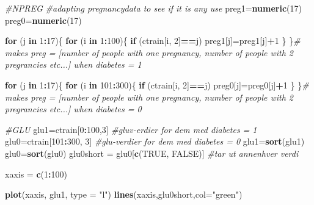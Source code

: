 \documentclass[]{article}
\newenvironment{Shaded}{\begin{snugshade}}{\end{snugshade}}
\newcommand{\KeywordTok}[1]{\textcolor[rgb]{0.13,0.29,0.53}{\textbf{#1}}}
\newcommand{\DataTypeTok}[1]{\textcolor[rgb]{0.13,0.29,0.53}{#1}}
\newcommand{\DecValTok}[1]{\textcolor[rgb]{0.00,0.00,0.81}{#1}}
\newcommand{\StringTok}[1]{\textcolor[rgb]{0.31,0.60,0.02}{#1}}
\newcommand{\CommentTok}[1]{\textcolor[rgb]{0.56,0.35,0.01}{\textit{#1}}}
\newcommand{\OtherTok}[1]{\textcolor[rgb]{0.56,0.35,0.01}{#1}}
\newcommand{\ControlFlowTok}[1]{\textcolor[rgb]{0.13,0.29,0.53}{\textbf{#1}}}
\newcommand{\OperatorTok}[1]{\textcolor[rgb]{0.81,0.36,0.00}{\textbf{#1}}}
\newcommand{\NormalTok}[1]{#1}
\begin{document}
\begin{Shaded}
\begin{Highlighting}[]
\CommentTok{#NPREG}
\CommentTok{#adapting pregnancydata to see if it is any use }
\NormalTok{preg1=}\KeywordTok{numeric}\NormalTok{(}\DecValTok{17}\NormalTok{)}
\NormalTok{preg0=}\KeywordTok{numeric}\NormalTok{(}\DecValTok{17}\NormalTok{)}

\ControlFlowTok{for}\NormalTok{ (j }\ControlFlowTok{in} \DecValTok{1}\OperatorTok{:}\DecValTok{17}\NormalTok{)\{}
  \ControlFlowTok{for}\NormalTok{ (i }\ControlFlowTok{in} \DecValTok{1}\OperatorTok{:}\DecValTok{100}\NormalTok{)\{}
    \ControlFlowTok{if}\NormalTok{ (ctrain[i, }\DecValTok{2}\NormalTok{]}\OperatorTok{==}\NormalTok{j)}
\NormalTok{        preg1[j]=preg1[j]}\OperatorTok{+}\DecValTok{1}
\NormalTok{    \}}
\NormalTok{\}}\CommentTok{# makes preg = [number of people with one pregnancy, number of people with 2 pregrancies etc...] when diabetes = 1}

\ControlFlowTok{for}\NormalTok{ (j }\ControlFlowTok{in} \DecValTok{1}\OperatorTok{:}\DecValTok{17}\NormalTok{)\{}
  \ControlFlowTok{for}\NormalTok{ (i }\ControlFlowTok{in} \DecValTok{101}\OperatorTok{:}\DecValTok{300}\NormalTok{)\{}
    \ControlFlowTok{if}\NormalTok{ (ctrain[i, }\DecValTok{2}\NormalTok{]}\OperatorTok{==}\NormalTok{j)}
\NormalTok{        preg0[j]=preg0[j]}\OperatorTok{+}\DecValTok{1}
\NormalTok{    \}}
\NormalTok{\}}\CommentTok{# makes preg = [number of people with one pregnancy, number of people with 2 pregrancies etc...] when diabetes = 0}


\CommentTok{#GLU}
\NormalTok{glu1=ctrain[}\DecValTok{0}\OperatorTok{:}\DecValTok{100}\NormalTok{,}\DecValTok{3}\NormalTok{] }\CommentTok{#gluv-erdier for dem med diabetes = 1}
\NormalTok{glu0=ctrain[}\DecValTok{101}\OperatorTok{:}\DecValTok{300}\NormalTok{, }\DecValTok{3}\NormalTok{] }\CommentTok{#glu-verdier for dem med diabetes = 0}
\NormalTok{glu1=}\KeywordTok{sort}\NormalTok{(glu1)}
\NormalTok{glu0=}\KeywordTok{sort}\NormalTok{(glu0)}
\NormalTok{glu0short =}\StringTok{ }\NormalTok{glu0[}\KeywordTok{c}\NormalTok{(}\OtherTok{TRUE}\NormalTok{, }\OtherTok{FALSE}\NormalTok{)] }\CommentTok{#tar ut annenhver verdi }

\NormalTok{xaxis =}\StringTok{ }\KeywordTok{c}\NormalTok{(}\DecValTok{1}\OperatorTok{:}\DecValTok{100}\NormalTok{)}

\KeywordTok{plot}\NormalTok{(xaxis, glu1, }\DataTypeTok{type =} \StringTok{"l"}\NormalTok{)}
\KeywordTok{lines}\NormalTok{(xaxis,glu0short,}\DataTypeTok{col=}\StringTok{"green"}\NormalTok{)}
\end{Highlighting}
\end{Shaded}
\end{document}
